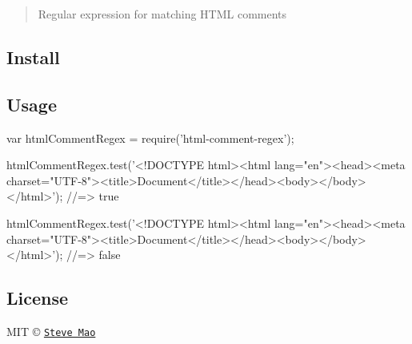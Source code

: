 \begin{quote}
Regular expression for matching H\+T\+ML comments \end{quote}


\subsection*{Install}




\subsection*{Usage}


\begin{DoxyCode}
var htmlCommentRegex = require('html-comment-regex');

htmlCommentRegex.test('<!DOCTYPE html><html lang="en"><head><meta
       charset="UTF-8"><title>Document</title></head><body></body></html>');
//=> true

htmlCommentRegex.test('<!DOCTYPE html><html lang="en"><head><meta
       charset="UTF-8"><title>Document</title></head><body></body></html>');
//=> false
\end{DoxyCode}


\subsection*{License}

M\+IT © \href{https://github.com/stevemao}{\tt Steve Mao} 
